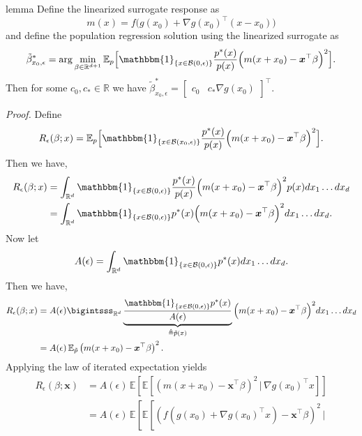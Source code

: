 \documentclass[11pt]{article}
\begin{document}
\begin{appendices}
\begin{restatable}[Surrogate]{lemma}{} \label{lemma: surrogate problem} Define the linearized surrogate response as
\[m(x) = f\Big(g(x_0) + \nabla g(x_0)^{\top}(x-x_0)\Big)\]
and define the population regression solution using the linearized surrogate as 
\[\tilde{\beta}^*_{x_0, \epsilon} = \arg\min_{\beta \in \mathbb{R}^{d+1}}\mathbb{E}_{ p}\Big[\mathbbm{1}_{\{x \in \mathcal{B}(0, \epsilon)\}}\frac{p^*(x)}{p(x)}\Big(m(x + x_0) - \boldsymbol{x}^{\top}\beta \Big)^2\Big].\]
Then for some $c_0, c_* \in \mathbb{R}$ we have $\tilde{\beta}^*_{x_0, \epsilon} = \begin{bmatrix}c_0  & c_*\nabla g(x_0) \end{bmatrix}^{\top}$. 
\end{restatable}
\noindent \textit{Proof.} Define 
\[R_{\epsilon}(\beta; x) = \mathbb{E}_{ p}\Big[\mathbbm{1}_{\{x \in \mathcal{B}(x_0, \epsilon)\}}\frac{p^*(x)}{p(x)}\Big(m(x + x_0) - \boldsymbol{x}^{\top}\beta\Big)^2\Big].\]
Then we have,
\begin{align*}
    R_{\epsilon}(\beta; x)&= \int_{\mathbb{R}^d}\mathbbm{1}_{\{x \in \mathcal{B}(0, \epsilon)\}}\frac{p^*(x)}{p(x)}\Big(m(x+x_0) - \boldsymbol{x}^{\top}\beta\Big)^2p(x) dx_1 \dots dx_d \\
    &= \int_{\mathbb{R}^d}\mathbbm{1}_{\{x \in \mathcal{B}(0, \epsilon)\}}p^*(x)\Big(m(x + x_0) - \boldsymbol{x}^{\top}\beta \Big)^2 dx_1 \dots dx_d.
\end{align*}
Now let 
\begin{equation}
    A(\epsilon) = \int_{\mathbb{R}^d} \mathbbm{1}_{\{x \in \mathcal{B}(0, \epsilon)\}}p^*(x) dx_1 \dots dx_d.
\end{equation}
Then we have,
\begin{align*}
    R_{\epsilon}(\beta; x)&= A(\epsilon) \bigintsss_{\mathbb{R}^d}\underbrace{\frac{\mathbbm{1}_{\{x \in \mathcal{B}(0, \epsilon)\}}p^*(x)}{A(\epsilon)}}_{\triangleq \tilde{p}(x)}\Big(m(x+x_0) - \boldsymbol{x}^{\top}\beta \Big)^2 dx_1 \dots dx_d \\
    &= A(\epsilon)\, \mathbb{E}_{ \tilde{p}}\left(m(x+x_0)-\boldsymbol{x}^{\top}\beta\right)^2.
\end{align*}
Applying the law of iterated expectation yields
\begin{align*}
    R_{\epsilon}(\beta; \boldsymbol{x})&= A(\epsilon)\,\mathbb{E}\left[\mathbb{E}\left[\left(m(x+x_0)-\boldsymbol{x}^{\top}\beta\right)^2 \, \Big|
    \, \nabla g(x_0)^{\top}x\right]\right]\\
    &= A(\epsilon)\,\mathbb{E}\left[\mathbb{E}\left[\left(f\left(g(x_0) + \nabla g(x_0)^{\top}x\right)-\boldsymbol{x}^{\top}\beta\right)^2 \, \Big|

\end{align*}
\end{appendices}
\end{document}
